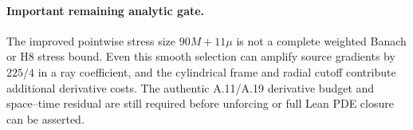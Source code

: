 \paragraph{Important remaining analytic gate.}
The improved pointwise stress size $90M+11\mu$ is not
a complete weighted Banach or H8 stress bound. Even this
smooth selection can amplify source gradients by $225/4$
in a ray coefficient, and the cylindrical frame and radial
cutoff contribute additional derivative costs. The authentic
A.11/A.19 derivative budget and space--time residual are
still required before unforcing or full Lean PDE closure
can be asserted.
